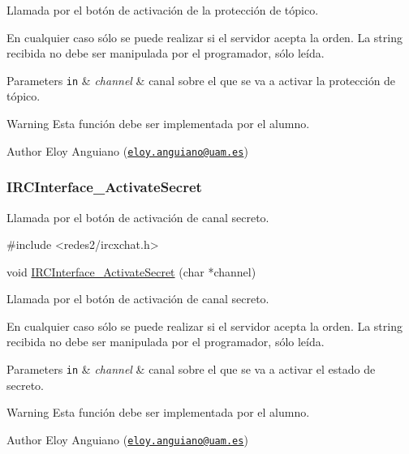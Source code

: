 Llamada por el botón de activación de la protección de tópico.

En cualquier caso sólo se puede realizar si el servidor acepta la orden. La string recibida no debe ser manipulada por el programador, sólo leída.


\begin{DoxyParams}[1]{Parameters}
\mbox{\tt in}  & {\em channel} & canal sobre el que se va a activar la protección de tópico.\\
\hline
\end{DoxyParams}
\begin{DoxyWarning}{Warning}
Esta función debe ser implementada por el alumno.
\end{DoxyWarning}
\begin{DoxyAuthor}{Author}
Eloy Anguiano (\href{mailto:eloy.anguiano@uam.es}{\tt eloy.\-anguiano@uam.\-es})
\end{DoxyAuthor}


 \hypertarget{IRCInterface_ActivateSecret}{}\subsubsection{I\-R\-C\-Interface\-\_\-\-Activate\-Secret}\label{IRCInterface_ActivateSecret}
Llamada por el botón de activación de canal secreto.


\begin{DoxyCode}
\textcolor{preprocessor}{#include <redes2/ircxchat.h>}

\textcolor{keywordtype}{void} \hyperlink{xchat2_8c_aa9e9155115b834d85a4d10cb27f99093}{IRCInterface\_ActivateSecret} (\textcolor{keywordtype}{char} *channel)
\end{DoxyCode}


Llamada por el botón de activación de canal secreto.

En cualquier caso sólo se puede realizar si el servidor acepta la orden. La string recibida no debe ser manipulada por el programador, sólo leída.


\begin{DoxyParams}[1]{Parameters}
\mbox{\tt in}  & {\em channel} & canal sobre el que se va a activar el estado de secreto.\\
\hline
\end{DoxyParams}
\begin{DoxyWarning}{Warning}
Esta función debe ser implementada por el alumno.
\end{DoxyWarning}
\begin{DoxyAuthor}{Author}
Eloy Anguiano (\href{mailto:eloy.anguiano@uam.es}{\tt eloy.\-anguiano@uam.\-es})
\end{DoxyAuthor}


